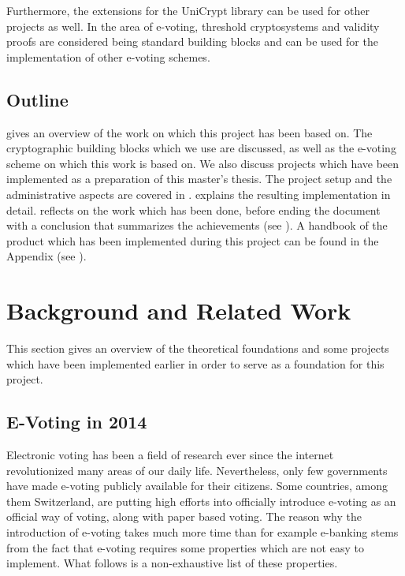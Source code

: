 \documentclass[numbers=noenddot, abstract=on, a4paper, headsepline,
footsepline, oneside, openright, draft=off, listof=leveldown]{scrreprt}
\newcommand{\myref}[1]{(see \Vref{#1})}
\begin{document}
Furthermore, the extensions for the UniCrypt library can be used for other
projects as well. In the area of e-voting, threshold cryptosystems and validity
proofs are considered being standard building blocks and can be used for the
implementation of other e-voting schemes.

\section{Outline}
\label{sec:outline}
 gives an overview of the work on which this project has been
based on. The cryptographic building blocks which we use are discussed, as well
as the e-voting scheme on which this work is based on. We also discuss projects
which have been implemented as a preparation of this master's thesis.
The project setup and the administrative aspects are covered in
.  explains the resulting
implementation in detail.
 reflects on the work which has been done, before ending
the document with a conclusion that summarizes the achievements
\myref{cha:conclusion}.
A handbook of the product which has been implemented during this project can be
found in the Appendix \myref{cha:handbook}.

\chapter{Background and Related Work}
\label{cha:brw}
This section gives an overview of the theoretical foundations and some projects
which have been implemented earlier in order to serve as a foundation for this
project. 

\section{E-Voting in 2014}
\label{sec:evoting}
Electronic voting has been a field of research ever since the internet
revolutionized many areas of our daily life. Nevertheless, only few governments
have made e-voting publicly available for their citizens. Some countries, among
them Switzerland, are putting high efforts into officially introduce
e-voting as an official way of voting, along with paper based voting. The reason
why the introduction of e-voting takes much more time than for example e-banking
stems from the fact that e-voting requires some properties which are not easy to
implement. What follows is a non-exhaustive list of these properties.
\end{document}
